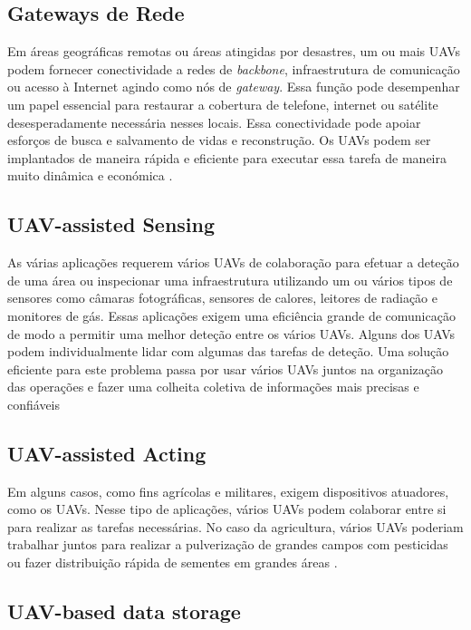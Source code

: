 \subsection{Gateways de Rede}

Em áreas geográficas remotas ou áreas atingidas por desastres, um ou mais UAVs podem fornecer conectividade a redes de \textit{backbone}, infraestrutura de comunicação ou acesso à Internet agindo como nós de \textit{gateway}. Essa função pode desempenhar um papel essencial para restaurar a cobertura de telefone, internet ou satélite desesperadamente necessária nesses locais. Essa conectividade pode apoiar esforços de busca e salvamento de vidas e reconstrução. Os UAVs podem ser implantados de maneira rápida e eficiente para executar essa tarefa de maneira muito dinâmica e económica \cite{ImadJawhar2017}.

\subsection{UAV-assisted Sensing}

As várias aplicações requerem vários UAVs de colaboração para efetuar a deteção de uma área ou inspecionar uma infraestrutura utilizando um ou vários tipos de sensores como câmaras fotográficas, sensores de calores, leitores de radiação e monitores de gás. Essas aplicações exigem uma eficiência grande de comunicação de modo a permitir uma melhor deteção entre os vários UAVs. Alguns dos UAVs podem individualmente lidar com algumas das tarefas de deteção. Uma solução eficiente para este problema passa por usar vários UAVs juntos na organização das operações e fazer uma colheita coletiva de informações mais precisas e confiáveis \cite{ImadJawhar2017}

\subsection{UAV-assisted Acting}

Em alguns casos, como fins agrícolas e militares, exigem dispositivos atuadores, como os UAVs. Nesse tipo de aplicações, vários UAVs podem colaborar entre si para realizar as tarefas necessárias. No caso da agricultura, vários UAVs poderiam trabalhar juntos para realizar a pulverização de grandes campos com pesticidas ou fazer distribuição rápida de sementes em grandes áreas \cite{ImadJawhar2017}.

\subsection{UAV-based data storage}

